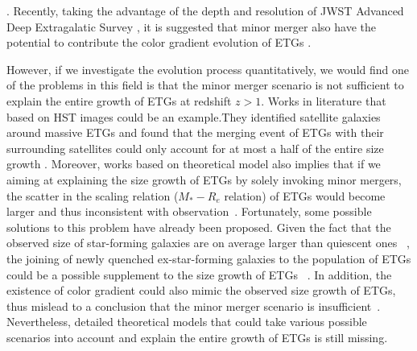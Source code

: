 \documentclass[fleqn,usenatbib]{mnras}
\begin{document}
\citep[e.g.][]{naab_minor_2009, van_dokkum_2010_hubble, oser_cosmological_2011, newman2012, hilz_how_2013, dekel_wet_2014, deugenio2023}. Recently, taking the advantage of the depth and resolution of JWST Advanced Deep Extragalatic Survey \citep{Gardner_JWST,Eisenstein_JADES}, it is suggested that minor merger also have the potential to contribute the color gradient evolution of ETGs \citep{Suess2023}.
\par However, if we investigate the evolution process quantitatively, we would find one of the problems in this field is that the minor merger scenario is not sufficient to explain the entire growth of ETGs at redshift $z > 1$. Works in literature that based on HST images could be an example.They identified satellite galaxies around massive ETGs and found that the merging event of ETGs with their surrounding satellites could only account for at most a half of the entire size growth \citep{newman2012,Belli_2015}. Moreover, works based on theoretical model also implies that if we aiming at explaining the size growth of ETGs by solely invoking minor mergers, the scatter in the scaling relation ($M_*-R_e$ relation) of ETGs would become larger and thus inconsistent with observation~\citep{nipoti2009,nipoti12}. Fortunately, some possible solutions to this problem have already been proposed. Given the fact that the observed size of star-forming galaxies are on average larger than quiescent ones ~\citep[e.g.][]{newman2012,vanderwel3DHSTCANDELSEvolution2014,Belli_2015,KiDs_Roy}, the joining of newly quenched ex-star-forming galaxies to the population of ETGs could be a possible supplement to the size growth of ETGs ~\citep[e.g.][]{van_dokkum_1996,vandokkumMorphologicalEvolutionAges2001,carolloNEWLYQUENCHEDGALAXIES2013,fagioliMinorMergersProgenitor2016}. In addition, the existence of color gradient could also mimic the observed size growth of ETGs, thus mislead to a conclusion that the minor merger scenario is insufficient~\citep{Suess2019a,Suess2019b}.
 Nevertheless, detailed theoretical models that could take various possible scenarios into account and explain the entire growth of ETGs is still missing.
\end{document}
